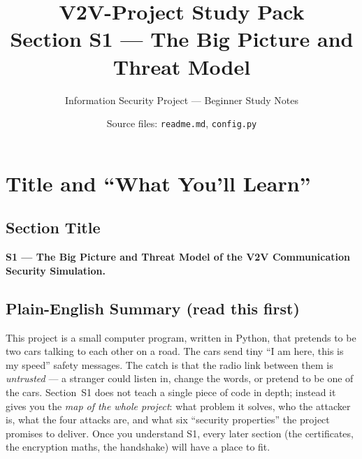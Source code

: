 \documentclass[11pt,a4paper]{article}
\title{\textbf{V2V-Project Study Pack}\\[4pt]
       \large Section S1 --- The Big Picture and Threat Model}
\author{Information Security Project --- Beginner Study Notes}
\date{Source files: \texttt{readme.md}, \texttt{config.py}}
\begin{document}
\maketitle
\tableofcontents
\newpage

\section{Title and ``What You'll Learn''}

\subsection*{Section Title}
\textbf{S1 --- The Big Picture and Threat Model of the V2V Communication
Security Simulation.}

\subsection*{Plain-English Summary (read this first)}
This project is a small computer program, written in Python, that pretends to
be two cars talking to each other on a road. The cars send tiny ``I am here,
this is my speed'' safety messages. The catch is that the radio link between
them is \emph{untrusted} --- a stranger could listen in, change the words, or
pretend to be one of the cars. Section~S1 does not teach a single piece of code
in depth; instead it gives you the \emph{map of the whole project}: what problem
it solves, who the attacker is, what the four attacks are, and what six
``security properties'' the project promises to deliver. Once you understand
S1, every later section (the certificates, the encryption maths, the handshake)
will have a place to fit.
\end{document}
